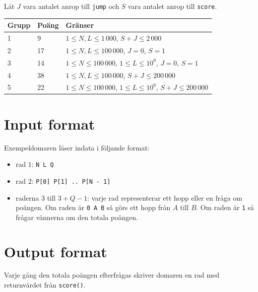 Låt $J$ vara antalet anrop till \texttt{jump} och $S$ vara antalet anrop till \texttt{score}.

\begin{tabular}{|l|l|l|}
  \hline
  \textbf{Grupp} & \textbf{Poäng} & \textbf{Gränser} \\ \hline
  1 & 9 & $1 \le N, L \le 1\,000$,  $S + J \le 2\,000$ \\ \hline
  2 & 17 & $1 \le N, L \le 100\,000$, $J = 0$, $S = 1$ \\ \hline
  3 & 14 & $1 \le N \le 100\,000$, $1 \le L \le 10^9$, $J = 0$, $S = 1$ \\ \hline
  4 & 38 & $1 \le N, L \le 100\,000$, $S + J \le 200\,000$ \\ \hline
  5 & 22 & $1 \le N \le 100\,000$, $1 \le L \le 10^9$, $S + J \le 200\,000$ \\ \hline
\end{tabular}

\section*{Input format}
Exempeldomaren läser indata i följande format:

\begin{itemize}
  \item rad $1$: \texttt{N L Q}
  \item rad $2$: \texttt{P[0] P[1] .. P[N - 1]}
  \item raderna $3$ till $3 + Q - 1$: varje rad representerar ett hopp eller en fråga om poängen.
    Om raden är \texttt{0 A B} så görs ett hopp från $A$ till $B$. Om raden är \texttt{1} så frågar vännerna om den totala poängen.
\end{itemize}

\section*{Output format}
Varje gång den totala poängen efterfrågas skriver domaren en rad med returnvärdet från \texttt{score()}.
